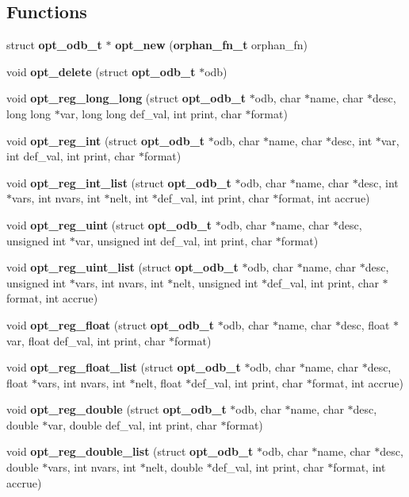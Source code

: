 \subsection*{Functions}
\begin{CompactItemize}
\item 
struct {\bf opt\_\-odb\_\-t} $\ast$ {\bf opt\_\-new} ({\bf orphan\_\-fn\_\-t} orphan\_\-fn)
\item 
void {\bf opt\_\-delete} (struct {\bf opt\_\-odb\_\-t} $\ast$odb)
\item 
void {\bf opt\_\-reg\_\-long\_\-long} (struct {\bf opt\_\-odb\_\-t} $\ast$odb, char $\ast$name, char $\ast$desc, long long $\ast$var, long long def\_\-val, int print, char $\ast$format)
\item 
void {\bf opt\_\-reg\_\-int} (struct {\bf opt\_\-odb\_\-t} $\ast$odb, char $\ast$name, char $\ast$desc, int $\ast$var, int def\_\-val, int print, char $\ast$format)
\item 
void {\bf opt\_\-reg\_\-int\_\-list} (struct {\bf opt\_\-odb\_\-t} $\ast$odb, char $\ast$name, char $\ast$desc, int $\ast$vars, int nvars, int $\ast$nelt, int $\ast$def\_\-val, int print, char $\ast$format, int accrue)
\item 
void {\bf opt\_\-reg\_\-uint} (struct {\bf opt\_\-odb\_\-t} $\ast$odb, char $\ast$name, char $\ast$desc, unsigned int $\ast$var, unsigned int def\_\-val, int print, char $\ast$format)
\item 
void {\bf opt\_\-reg\_\-uint\_\-list} (struct {\bf opt\_\-odb\_\-t} $\ast$odb, char $\ast$name, char $\ast$desc, unsigned int $\ast$vars, int nvars, int $\ast$nelt, unsigned int $\ast$def\_\-val, int print, char $\ast$format, int accrue)
\item 
void {\bf opt\_\-reg\_\-float} (struct {\bf opt\_\-odb\_\-t} $\ast$odb, char $\ast$name, char $\ast$desc, float $\ast$var, float def\_\-val, int print, char $\ast$format)
\item 
void {\bf opt\_\-reg\_\-float\_\-list} (struct {\bf opt\_\-odb\_\-t} $\ast$odb, char $\ast$name, char $\ast$desc, float $\ast$vars, int nvars, int $\ast$nelt, float $\ast$def\_\-val, int print, char $\ast$format, int accrue)
\item 
void {\bf opt\_\-reg\_\-double} (struct {\bf opt\_\-odb\_\-t} $\ast$odb, char $\ast$name, char $\ast$desc, double $\ast$var, double def\_\-val, int print, char $\ast$format)
\item 
void {\bf opt\_\-reg\_\-double\_\-list} (struct {\bf opt\_\-odb\_\-t} $\ast$odb, char $\ast$name, char $\ast$desc, double $\ast$vars, int nvars, int $\ast$nelt, double $\ast$def\_\-val, int print, char $\ast$format, int accrue)

\end{CompactItemize}
